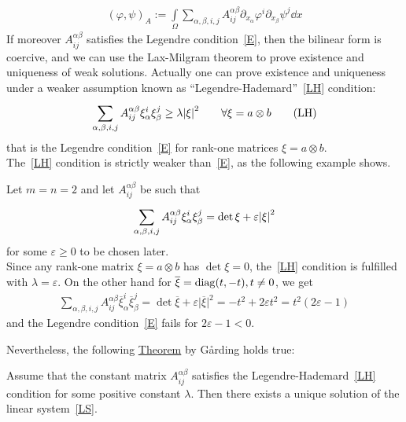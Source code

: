 \begin{gather}
	{(\varphi,\psi)}_A := \int\limits_{\Omega}^{} \sum_{\alpha, \beta, i,j}^{} A_{ij}^{\alpha \beta} \partial_{x_{\alpha}} \varphi^{i} \partial_{x_{\beta}} \psi^{j} \dd{x}
\end{gather}
If moreover \(A_{ij}^{\alpha \beta}\) satisfies the Legendre condition~\eqref{E}, then the bilinear form is coercive, and we can use the Lax-Milgram theorem to prove existence and uniqueness of weak solutions. Actually one can prove existence and uniqueness under a weaker assumption known as \enquote{Legendre-Hademard}~\eqref{LH} condition:
\begin{gather}
	\sum_{\alpha,\beta,i,j}^{} A_{ij}^{\alpha \beta} \xi_{\alpha}^{i} \xi_{\beta}^{j}\geq \lambda \abs{\xi}^{2} \qquad \forall \xi=a \otimes b \tag{LH} \label{LH}
\end{gather}
that is the Legendre condition~\eqref{E} for rank-one matrices \(\xi=a\otimes b\).\\
The~\eqref{LH} condition is strictly weaker than~\eqref{E}, as the following example shows.

\begin{exm}
	Let \(m=n=2\) and let \(A_{ij}^{\alpha \beta}\) be such that
	\begin{gather}
		\sum_{\alpha, \beta, i,j}^{}  A_{ij}^{\alpha \beta} \xi_{\alpha}^{i} \xi_{\beta}^{j} = \det \xi + \varepsilon \abs{\xi}^{2}
	\end{gather}
	for some \(\varepsilon \geq 0\) to be chosen later.\\
	Since any rank-one matrix \(\xi = a \otimes b\) has \(\det \xi =0\), the~\eqref{LH} condition is fulfilled with \(\lambda = \varepsilon \). On the other hand for \(\overline{\xi} = \operatorname{diag}(t,-t), t \neq 0\), we get
	\begin{gather}
		\sum_{\alpha, \beta, i,j}^{}  A_{ij}^{\alpha \beta} \overline{\xi}_{\alpha}^{i} \overline{\xi}_{\beta}^{j} = \det \overline{\xi} + \varepsilon \vert \overline{\xi} \vert^{2} = -t^{2}+2 \varepsilon t^{2} = t^{2}(2 \varepsilon -1)
	\end{gather}
	and the Legendre condition~\eqref{E} fails for \(2 \varepsilon-1 <0\).
\end{exm}
Nevertheless, the following \underline{Theorem} by G\r{a}rding holds true:
\begin{thm}
	Assume that the constant matrix \(A_{ij}^{\alpha \beta}\) satisfies the Legendre-Hademard~\eqref{LH} condition for some positive constant \(\lambda \). Then there exists a unique solution of the linear system~\eqref{LS}.
\end{thm}


